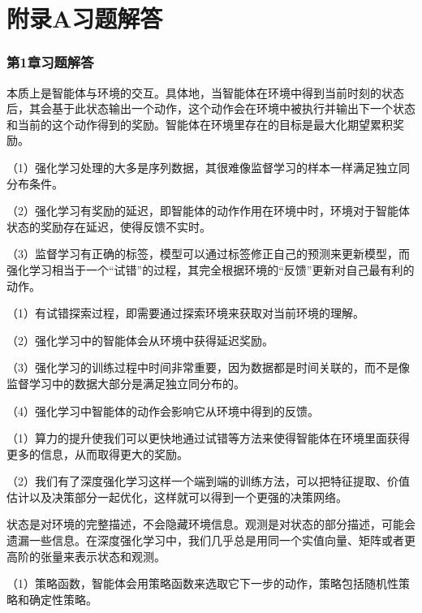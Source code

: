 \appendix
\section{附录A习题解答}

\subsubsection*{第1章习题解答}


本质上是智能体与环境的交互。具体地，当智能体在环境中得到当前时刻的状态后，其会基于此状态输出一个动作，这个动作会在环境中被执行并输出下一个状态和当前的这个动作得到的奖励。智能体在环境里存在的目标是最大化期望累积奖励。


（1）强化学习处理的大多是序列数据，其很难像监督学习的样本一样满足独立同分布条件。
  
（2）强化学习有奖励的延迟，即智能体的动作作用在环境中时，环境对于智能体状态的奖励存在延迟，使得反馈不实时。
    
（3）监督学习有正确的标签，模型可以通过标签修正自己的预测来更新模型，而强化学习相当于一个“试错”的过程，其完全根据环境的“反馈”更新对自己最有利的动作。

  
（1）有试错探索过程，即需要通过探索环境来获取对当前环境的理解。
  
（2）强化学习中的智能体会从环境中获得延迟奖励。
  
（3）强化学习的训练过程中时间非常重要，因为数据都是时间关联的，而不是像监督学习中的数据大部分是满足独立同分布的。
    
（4）强化学习中智能体的动作会影响它从环境中得到的反馈。

  
（1）算力的提升使我们可以更快地通过试错等方法来使得智能体在环境里面获得更多的信息，从而取得更大的奖励。
  
（2）我们有了深度强化学习这样一个端到端的训练方法，可以把特征提取、价值估计以及决策部分一起优化，这样就可以得到一个更强的决策网络。


状态是对环境的完整描述，不会隐藏环境信息。观测是对状态的部分描述，可能会遗漏一些信息。在深度强化学习中，我们几乎总是用同一个实值向量、矩阵或者更高阶的张量来表示状态和观测。

  
（1）策略函数，智能体会用策略函数来选取它下一步的动作，策略包括随机性策略和确定性策略。
  
